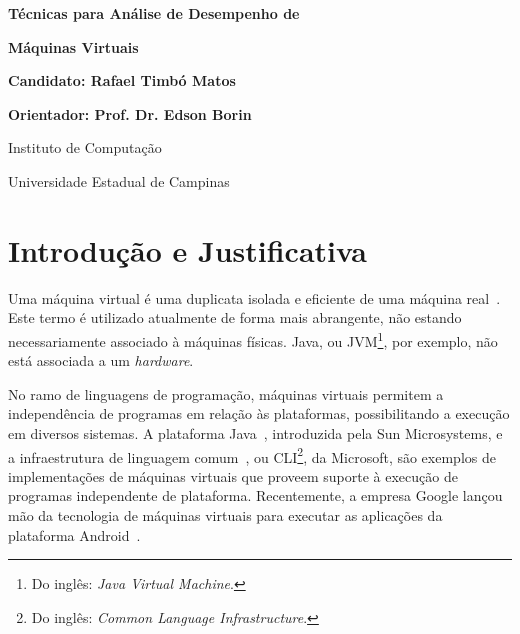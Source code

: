 \documentclass[a4paper,12pt]{article}
\def\candidato{Rafael Timbó Matos}
\def\orientador{Prof. Dr. Edson Borin}
\newcommand{\hardware}{\emph{hardware}}
\newcommand{\benchmarks}{\emph{benchmarks}}
\begin{document}
\thispagestyle{empty}
\bigskip
\bigskip
\centerline{\LARGE\bf Técnicas para Análise de Desempenho de}
\centerline{\LARGE\bf Máquinas Virtuais}
\bigskip\bigskip
\centerline{\large\bf Candidato: \candidato}
\centerline{\large\bf Orientador: \orientador}
\bigskip\bigskip
\centerline{\large Instituto de Computação}
\centerline{\large Universidade Estadual de Campinas}
\bigskip
\def\abstractname{\normalsize Resumo}

\begin{abstract}\normalsize

A análise de desempenho de processadores tem sido realizada através da execução
de conjuntos de aplicações denominados \benchmarks. Da mesma forma, a comunidade
científica tipicamente emprega o uso dos mesmos \benchmarks\ para avaliar o
desempenho de Máquinas Virtuais. Entretanto, resultados de pesquisas
recentes~\cite{divino2012wish} indicam que os \benchmarks\ tipicamente
utilizados para avaliação de processadores (SPEC CPU) podem mascarar a
sobrecarga das técnicas de emulação quando utilizados para avaliar máquinas
virtuais. Assim sendo, este trabalho propõe um levantamento de
\benchmarks\ voltados para a análise de máquinas virtuais e a construção de um
banco de dados para armazenar resultados de experimentos. Tais
\benchmarks\ possibilitarão a avaliação e o desenvolvimento de técnicas de
emulação em máquinas virtuais e o estudo de técnicas eficientes de
interpretação, considerando adequadamente a sobrecarga das técnicas de emulação.
\end{abstract}


\section{Introdução e Justificativa}
\label{sec:intro}
Uma máquina virtual é uma duplicata isolada e eficiente de uma máquina
real~\cite{popek_goldberg}. Este termo é utilizado atualmente de forma mais
abrangente, não estando necessariamente associado à máquinas físicas. Java, ou
JVM\footnote{Do inglês: \emph{Java Virtual Machine}.}, por exemplo, não está
associada a um \hardware.

No ramo de linguagens de programação, máquinas virtuais permitem a independência
de programas em relação às plataformas, possibilitando a execução em diversos
sistemas. A plataforma Java~\cite{java}, introduzida pela Sun Microsystems, e a
infraestrutura de linguagem comum~\cite{cli}, ou CLI\footnote{Do inglês:
  \emph{Common Language Infrastructure}.}, da Microsoft, são exemplos de
implementações de máquinas virtuais que proveem suporte à execução de programas
independente de plataforma. Recentemente, a empresa Google lançou mão da
tecnologia de máquinas virtuais para executar as aplicações da plataforma
Android~\cite{ehringer2010dalvik}.
\end{document}
